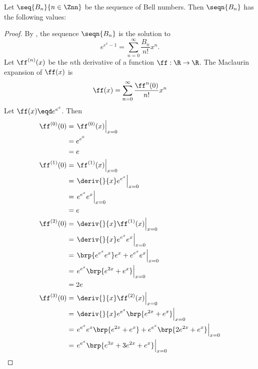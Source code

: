\begin{proposition}
\label{prop:bell_e}
Let $\seq{B_n}{n\in\Znn}$ be the sequence of Bell numbers.
Then $\seqn{B_n}$ has the following values:
\end{proposition}
\begin{proof}
By , the sequence $\seqn{B_n}$ is the solution to
  \[  e^{e^x-1} = \sum_{n=0}^\infty \frac{B_n}{n!} x^n. \]
Let $\ff^{(n)}(x)$ be the $n$th derivative of a function $\ff:\R\to\R$.
The Maclaurin expansion of $\ff(x)$ is
  \[ \ff(x) = \sum_{n=0}^\infty \frac{\ff^{n}(0)}{n!} x^n \]
Let $\ff(x)\eqd e^{e^x}$. Then
\begin{align*}
  \ff^{(0)}(0)
    &= \left.\ff^{(0)}(x)\right|_{x=0}
  \\&= e^{e^0}
  \\&= e
  \\
  \ff^{(1)}(0)
    &= \left.\ff^{(1)}(x)\right|_{x=0}
  \\&= \left.\deriv{}{x} e^{e^x} \right|_{x=0}
  \\&= \left. e^{e^x} e^x \right|_{x=0}
  \\&= e
  \\
  \ff^{(2)}(0)
    &= \left.\deriv{}{x}\ff^{(1)}(x)\right|_{x=0}
  \\&= \left.\deriv{}{x} e^{e^x} e^x \right|_{x=0}
  \\&= \left.\brp{e^{e^x} e^x}e^x + e^{e^x}e^x \right|_{x=0}
  \\&= \left. e^{e^x} \brp{e^{2x} + e^x} \right|_{x=0}
  \\&= 2e
  \\
  \ff^{(3)}(0)
    &= \left.\deriv{}{x}\ff^{(2)}(x)\right|_{x=0}
  \\&= \left. \deriv{}{x} e^{e^x} \brp{e^{2x} + e^x} \right|_{x=0}
  \\&= \left. e^{e^x} e^x \brp{e^{2x} + e^x} + e^{e^x} \brp{2e^{2x} + e^x} \right|_{x=0}
  \\&= \left. e^{e^x} \brp{e^{3x} + 3e^{2x} + e^x}  \right|_{x=0}

\end{align*}
\end{proof}
